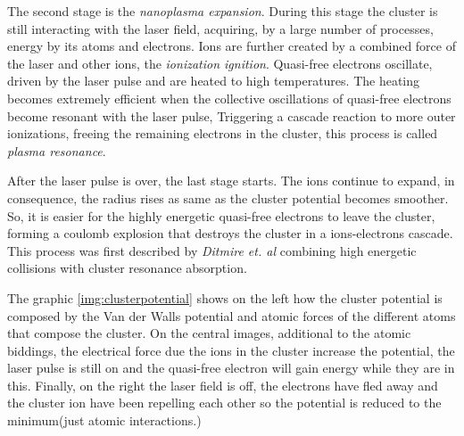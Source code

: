 The second stage is the  \textit{nanoplasma expansion}. During this stage the cluster is still interacting with the laser field, acquiring, by a large number of processes, energy by its atoms and electrons. Ions are further created by a combined force of the laser and other ions, the \textit{ionization ignition}\cite{gruner_femtosekundenspektroskopie_2013}. Quasi-free electrons oscillate, driven by the laser pulse and are heated to high temperatures. The heating becomes extremely efficient when the collective oscillations of quasi-free electrons become resonant with the laser pulse, Triggering a cascade reaction to more outer ionizations,  freeing the remaining electrons in the cluster, this process is called \textit{plasma resonance}\cite{saalmann_mechanisms_2006}.


After the laser pulse is over, the last stage starts. The ions continue to expand, in consequence, the radius rises as same as the cluster potential becomes smoother. So, it is easier for the highly energetic quasi-free electrons to leave the cluster, forming a coulomb explosion that destroys the cluster in a ions-electrons cascade. This process was first described by \textit{Ditmire et. al} \cite{ditmire_interaction_1996} combining high energetic collisions with cluster resonance absorption.

The graphic \ref{img:clusterpotential} shows on the left how the cluster potential is composed by the Van der Walls potential and atomic forces of the different atoms that compose the cluster. On the central images, additional to the atomic biddings, the electrical force due the ions in the cluster increase the potential, the laser pulse is still on and the quasi-free electron will gain energy while they are in this. Finally, on the right the laser field is off, the electrons have fled away and the cluster ion have been repelling each other so the potential is reduced to the minimum(just atomic interactions.)

